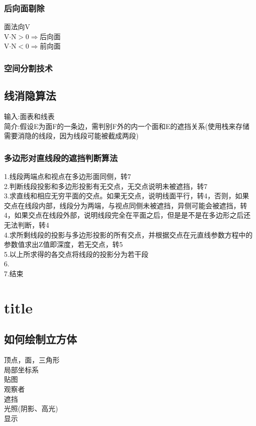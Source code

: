 \documentclass{article}
\begin{document}
\begin{CJK}{UTF8}{gbsn}
	\subsubsection{后向面剔除}
	面法向V\\
	V$\cdot$N$> 0\Rightarrow $后向面\\
	V$\cdot$N$< 0\Rightarrow $前向面\\
	\subsubsection{空间分割技术}
	
	\subsection{线消隐算法}
	输入:面表和线表\\
	简介:假设E为面F的一条边，需判别F外的内一个面和E的遮挡关系(使用栈来存储需要消隐的线段，因为线段可能被截成两段)\\
	\subsubsection{多边形对直线段的遮挡判断算法}
	1.线段两端点和视点在多边形面同侧，转7\\
	2.判断线段投影和多边形投影有无交点，无交点说明未被遮挡，转7\\
	3.求直线和相应无穷平面的交点。如果无交点，说明线面平行，转4，否则，如果交点在线段内部，线段分为两端，与视点同侧未被遮挡，异侧可能会被遮挡，转4，如果交点在线段外部，说明线段完全在平面之后，但是是不是在多边形之后还无法判断，转4\\
	4.求所剩线段的投影与多边形投影的所有交点，并根据交点在元直线参数方程中的参数值求出Z值即深度，若无交点，转5\\
	5.以上所求得的各交点将线段的投影分为若干段\\
	6.\\
	7.结束\\
	\section{title}
	\subsection{如何绘制立方体}
	顶点，面，三角形\\
	局部坐标系\\
	贴图\\
	观察者\\
	遮挡\\
	光照(阴影、高光)\\
	显示\\

\end{CJK}
\end{document}
